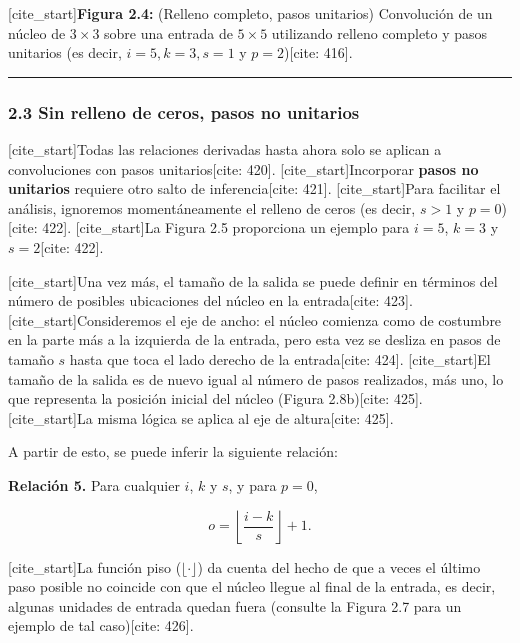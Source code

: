 \documentclass[
  super,
  preprint,
  3p]{elsarticle}
\begin{document}
{[}cite\_start{]}\textbf{Figura 2.4:} (Relleno completo, pasos
unitarios) Convolución de un núcleo de \(3 \times 3\) sobre una entrada
de \(5 \times 5\) utilizando relleno completo y pasos unitarios (es
decir, \(i = 5, k = 3, s = 1\) y \(p = 2\)){[}cite: 416{]}.

\begin{center}\rule{0.5\linewidth}{0.5pt}\end{center}

\subsubsection{2.3 Sin relleno de ceros, pasos no
unitarios}\label{sin-relleno-de-ceros-pasos-no-unitarios}

{[}cite\_start{]}Todas las relaciones derivadas hasta ahora solo se
aplican a convoluciones con pasos unitarios{[}cite: 420{]}.
{[}cite\_start{]}Incorporar \textbf{pasos no unitarios} requiere otro
salto de inferencia{[}cite: 421{]}. {[}cite\_start{]}Para facilitar el
análisis, ignoremos momentáneamente el relleno de ceros (es decir,
\(s > 1\) y \(p = 0\)){[}cite: 422{]}. {[}cite\_start{]}La Figura 2.5
proporciona un ejemplo para \(i = 5\), \(k = 3\) y \(s = 2\){[}cite:
422{]}.

{[}cite\_start{]}Una vez más, el tamaño de la salida se puede definir en
términos del número de posibles ubicaciones del núcleo en la
entrada{[}cite: 423{]}. {[}cite\_start{]}Consideremos el eje de ancho:
el núcleo comienza como de costumbre en la parte más a la izquierda de
la entrada, pero esta vez se desliza en pasos de tamaño \(s\) hasta que
toca el lado derecho de la entrada{[}cite: 424{]}. {[}cite\_start{]}El
tamaño de la salida es de nuevo igual al número de pasos realizados, más
uno, lo que representa la posición inicial del núcleo (Figura
2.8b){[}cite: 425{]}. {[}cite\_start{]}La misma lógica se aplica al eje
de altura{[}cite: 425{]}.

A partir de esto, se puede inferir la siguiente relación:

\textbf{Relación 5.} Para cualquier \(i\), \(k\) y \(s\), y para
\(p = 0\),

\[o = \left\lfloor \frac{i - k}{s} \right\rfloor + 1.\]

{[}cite\_start{]}La función piso (\(\lfloor \cdot \rfloor\)) da cuenta
del hecho de que a veces el último paso posible no coincide con que el
núcleo llegue al final de la entrada, es decir, algunas unidades de
entrada quedan fuera (consulte la Figura 2.7 para un ejemplo de tal
caso){[}cite: 426{]}.
\end{document}
